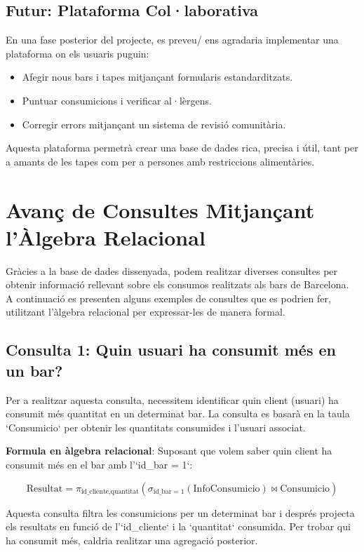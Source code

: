 \documentclass[12pt,a4paper]{article}
\begin{document}
\subsection{Futur: Plataforma Col·laborativa}

En una fase posterior del projecte, es preveu/ ens agradaria implementar una plataforma on els usuaris puguin:

\begin{itemize}
    \item Afegir nous bars i tapes mitjançant formularis estandarditzats.
    \item Puntuar consumicions i verificar al·lèrgens.
    \item Corregir errors mitjançant un sistema de revisió comunitària.
\end{itemize}

Aquesta plataforma permetrà crear una base de dades rica, precisa i útil, tant per a amants de les tapes com per a persones amb restriccions alimentàries.
\section{Avanç de Consultes Mitjançant l'Àlgebra Relacional}

Gràcies a la base de dades dissenyada, podem realitzar diverses consultes per obtenir informació rellevant sobre els consumos realitzats als bars de Barcelona. A continuació es presenten alguns exemples de consultes que es podrien fer, utilitzant l'àlgebra relacional per expressar-les de manera formal.

\subsection{Consulta 1: Quin usuari ha consumit més en un bar?}

Per a realitzar aquesta consulta, necessitem identificar quin client (usuari) ha consumit més quantitat en un determinat bar. La consulta es basarà en la taula `Consumicio` per obtenir les quantitats consumides i l'usuari associat.

\textbf{Formula en àlgebra relacional}: 
Suposant que volem saber quin client ha consumit més en el bar amb l'`id\_bar = 1`:

\[
\text{Resultat} = \pi_{\text{id\_cliente}, \text{quantitat}} \left( \sigma_{\text{id\_bar} = 1} (\text{InfoConsumicio}) \bowtie \text{Consumicio} \right)
\]

Aquesta consulta filtra les consumicions per un determinat bar i després projecta els resultats en funció de l'`id\_cliente` i la `quantitat` consumida. Per trobar qui ha consumit més, caldria realitzar una agregació posterior.
\end{document}
